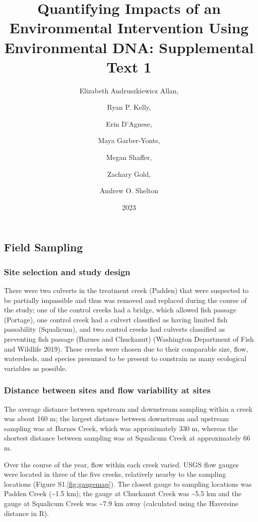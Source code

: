 \documentclass[
]{article}
\title{Quantifying Impacts of an Environmental Intervention Using
Environmental DNA: Supplemental Text 1}
\author{Elizabeth Andruszkiewicz Allan, \and Ryan P. Kelly, \and Erin
D'Agnese, \and Maya Garber-Yonts, \and Megan Shaffer, \and Zachary
Gold, \and Andrew O. Shelton}
\date{2023}
\begin{document}
\maketitle

\hypertarget{field-sampling}{%
\subsection{Field Sampling}\label{field-sampling}}

\hypertarget{site-selection-and-study-design}{%
\subsubsection{Site selection and study
design}\label{site-selection-and-study-design}}

There were two culverts in the treatment creek (Padden) that were
suspected to be partially impassible and thus was removed and replaced
during the course of the study; one of the control creeks had a bridge,
which allowed fish passage (Portage), one control creek had a culvert
classified as having limited fish passability (Squalicum), and two
control creeks had culverts classified as preventing fish passage
(Barnes and Chuckanut) (Washington Department of Fish and Wildlife
2019). These creeks were chosen due to their comparable size, flow,
watersheds, and species presumed to be present to constrain as many
ecological variables as possible.

\hypertarget{distance-between-sites-and-flow-variability-at-sites}{%
\subsubsection{Distance between sites and flow variability at
sites}\label{distance-between-sites-and-flow-variability-at-sites}}

The average distance between upstream and downstream sampling within a
creek was about 160 m; the largest distance between downstream and
upstream sampling was at Barnes Creek, which was approximately 330 m,
whereas the shortest distance between sampling was at Squalicum Creek at
approximately 66 m.

Over the course of the year, flow within each creek varied. USGS flow
gauges were located in three of the five creeks, relatively nearby to
the sampling locations (Figure S1.\ref{fig:gaugemap}). The closest gauge
to sampling locations was Padden Creek (\textasciitilde1.5 km); the
gauge at Chuckanut Creek was \textasciitilde5.5 km and the gauge at
Squalicum Creek was \textasciitilde7.9 km away (calculated using the
Haversine distance in R).
\end{document}
